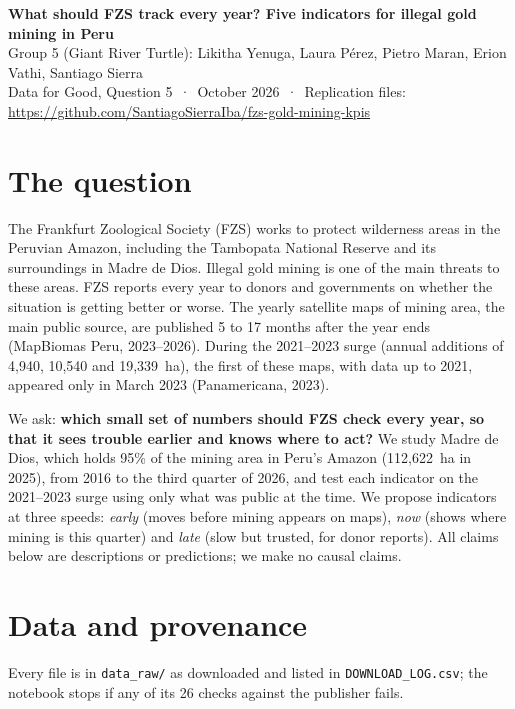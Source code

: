 \documentclass[10pt,a4paper]{article}
\begin{document}
\begin{center}
{\large\bfseries What should FZS track every year? Five indicators for illegal gold mining in Peru}\\[0.4ex]
{\small Group 5 (Giant River Turtle): Likitha Yenuga, Laura Pérez, Pietro Maran, Erion Vathi, Santiago Sierra\\
Data for Good, Question 5 \,·\, October 2026 \,·\, Replication files: \url{https://github.com/SantiagoSierraIba/fzs-gold-mining-kpis}}
\end{center}

\section{The question}

The Frankfurt Zoological Society (FZS) works to protect wilderness areas in the Peruvian Amazon, including the Tambopata National Reserve and its surroundings in Madre de Dios. Illegal gold mining is one of the main threats to these areas. FZS reports every year to donors and governments on whether the situation is getting better or worse. The yearly satellite maps of mining area, the main public source, are published 5 to 17 months after the year ends (MapBiomas Peru, 2023--2026). During the 2021--2023 surge (annual additions of 4,940, 10,540 and 19,339~ha), the first of these maps, with data up to 2021, appeared only in March 2023 (Panamericana, 2023).

We ask: \textbf{which small set of numbers should FZS check every year, so that it sees trouble earlier and knows where to act?} We study Madre de Dios, which holds 95\% of the mining area in Peru's Amazon (112,622~ha in 2025), from 2016 to the third quarter of 2026, and test each indicator on the 2021--2023 surge using only what was public at the time. We propose indicators at three speeds: \emph{early} (moves before mining appears on maps), \emph{now} (shows where mining is this quarter) and \emph{late} (slow but trusted, for donor reports). All claims below are descriptions or predictions; we make no causal claims.

\section{Data and provenance}

Every file is in \texttt{data\_raw/} as downloaded and listed in \texttt{DOWNLOAD\_LOG.csv}; the notebook stops if any of its 26 checks against the publisher fails.
\end{document}
